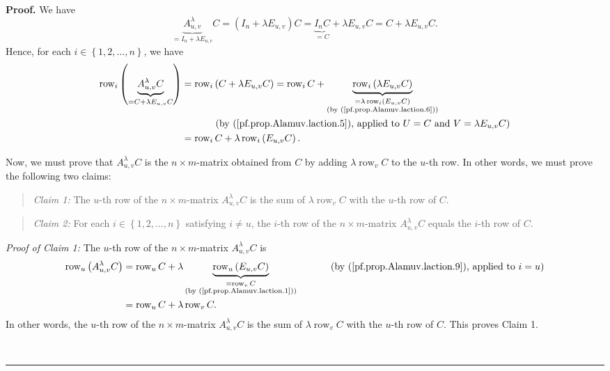 \documentclass[numbers=enddot,12pt,final,onecolumn,notitlepage]{scrartcl}%
\theoremstyle{definition}
\newenvironment{statement}{\begin{quote}}{\end{quote}}
\newenvironment{proof}[1][Proof]{\noindent\textbf{#1.} }{\ \rule{0.5em}{0.5em}}
\begin{document}
\begin{proof}
We have%
\[
\underbrace{A_{u,v}^{\lambda}}_{=I_{n}+\lambda E_{u,v}}C=\left(  I_{n}+\lambda
E_{u,v}\right)  C=\underbrace{I_{n}C}_{=C}+\lambda E_{u,v}C=C+\lambda
E_{u,v}C.
\]
Hence, for each $i\in\left\{  1,2,\ldots,n\right\}  $, we have%
\begin{align}
\operatorname*{row}\nolimits_{i}\left(  \underbrace{A_{u,v}^{\lambda}%
C}_{=C+\lambda E_{u,v}C}\right)   &  =\operatorname*{row}\nolimits_{i}\left(
C+\lambda E_{u,v}C\right)  =\operatorname*{row}\nolimits_{i}%
C+\underbrace{\operatorname*{row}\nolimits_{i}\left(  \lambda E_{u,v}C\right)
}_{\substack{=\lambda\operatorname*{row}\nolimits_{i}\left(  E_{u,v}C\right)
\\\text{(by (\ref{pf.prop.Alamuv.laction.6}))}}}\nonumber\\
&  \ \ \ \ \ \ \ \ \ \ \left(  \text{by (\ref{pf.prop.Alamuv.laction.5}),
applied to }U=C\text{ and }V=\lambda E_{u,v}C\right) \nonumber\\
&  =\operatorname*{row}\nolimits_{i}C+\lambda\operatorname*{row}%
\nolimits_{i}\left(  E_{u,v}C\right)  . \label{pf.prop.Alamuv.laction.9}%
\end{align}


Now, we must prove that $A_{u,v}^{\lambda}C$ is the $n\times m$-matrix
obtained from $C$ by adding $\lambda\operatorname*{row}\nolimits_{v}C$ to the
$u$-th row. In other words, we must prove the following two claims:

\begin{statement}
\textit{Claim 1:} The $u$-th row of the $n\times m$-matrix $A_{u,v}^{\lambda
}C$ is the sum of $\lambda\operatorname*{row}\nolimits_{v}C$ with the $u$-th
row of $C$.
\end{statement}

\begin{statement}
\textit{Claim 2:} For each $i\in\left\{  1,2,\ldots,n\right\}  $ satisfying
$i\neq u$, the $i$-th row of the $n\times m$-matrix $A_{u,v}^{\lambda}C$
equals the $i$-th row of $C$.
\end{statement}

\textit{Proof of Claim 1:} The $u$-th row of the $n\times m$-matrix
$A_{u,v}^{\lambda}C$ is%
\begin{align*}
\operatorname*{row}\nolimits_{u}\left(  A_{u,v}^{\lambda}C\right)   &
=\operatorname*{row}\nolimits_{u}C+\lambda\underbrace{\operatorname*{row}%
\nolimits_{u}\left(  E_{u,v}C\right)  }_{\substack{=\operatorname*{row}%
\nolimits_{v}C\\\text{(by (\ref{pf.prop.Alamuv.laction.1}))}}%
}\ \ \ \ \ \ \ \ \ \ \left(  \text{by (\ref{pf.prop.Alamuv.laction.9}),
applied to }i=u\right) \\
&  =\operatorname*{row}\nolimits_{u}C+\lambda\operatorname*{row}%
\nolimits_{v}C.
\end{align*}
In other words, the $u$-th row of the $n\times m$-matrix $A_{u,v}^{\lambda}C$
is the sum of $\lambda\operatorname*{row}\nolimits_{v}C$ with the $u$-th row
of $C$. This proves Claim 1.


\end{proof}
\end{document}
